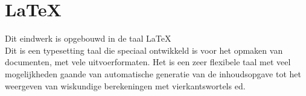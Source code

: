 \chapter{\LaTeX}
Dit eindwerk is opgebouwd in de taal \LaTeX\\
Dit is een typesetting taal die speciaal ontwikkeld is voor het opmaken van documenten, met vele uitvoerformaten. Het is een zeer flexibele taal met veel mogelijkheden gaande van automatische generatie van de inhoudsopgave tot het weergeven van wiskundige berekeningen met vierkantswortels ed.\\
